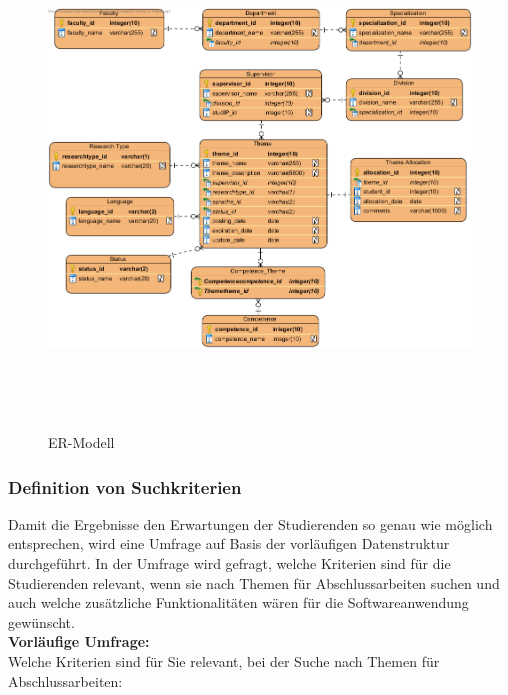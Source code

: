 \cleardoublepage
\begin{figure}[hp]%
    \centering
    \includegraphics[height=12.5cm,keepaspectratio]{pics/ER_model}\\
    \caption{ER-Modell}
\end{figure}


\subsubsection{Definition von Suchkriterien}
Damit die Ergebnisse den Erwartungen der Studierenden so genau wie möglich entsprechen, wird eine Umfrage auf Basis der vorläufigen Datenstruktur durchgeführt.
In der Umfrage wird gefragt, welche Kriterien sind für die Studierenden relevant, wenn sie nach Themen für Abschlussarbeiten suchen und auch welche zusätzliche Funktionalitäten wären für die Softwareanwendung gewünscht.\\

\newpage
\textbf{Vorläufige Umfrage:}\\

Welche Kriterien sind für Sie relevant, bei der Suche nach Themen für Abschlussarbeiten:
	
